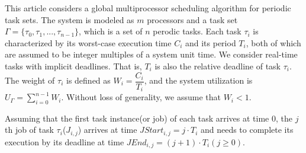 \documentclass{article}
\begin{document}
\newtheorem{defi}{Definition}
\newtheorem{lemm}{Lemma}

This article considers a global multiprocessor scheduling algorithm for periodic task sets. 
The system is modeled as $m$ processors and a task set $\Gamma = \{\tau_0, \tau_1, ..., \tau_{n-1}\}$, which is a set of $n$ perodic tasks.
Each task $\tau_i$ is characterized by its worst-case execution time $C_i$ and its period $T_i$, both of which are assumed to be integer multiples of a system unit time.
We consider real-time tasks with implicit deadlines.
That is, $T_i$ is also the relative deadline of task $\tau_i$.
The weight of $\tau_i$ is defined as $W_i = \dfrac{C_i}{T_i}$, and the system utilization is $U_\Gamma = \sum\limits_{i=0}^{n-1} W_i$. Without loss of generality, we assume that $W_i < 1$.

Assuming that the first task instance(or job) of each task arrives at time 0, the $j$th job of task $\tau_i$($J_{i,j}$) arrives at time $JStart_{i,j} = j \cdot T_i$ and needs to complete its execution by its deadline at time $JEnd_{i,j} = (j+1) \cdot T_i (j \geq 0)$.
\end{document}
